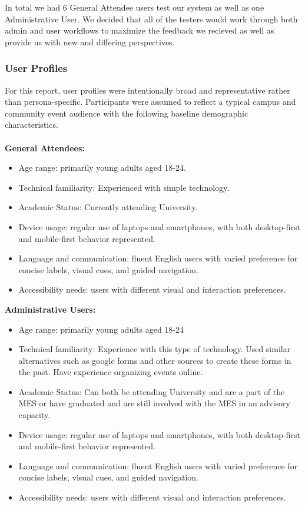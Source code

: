 \documentclass[12pt]{article}
\begin{document}
In total we had 6 General Attendee users test our system as well as one Administrative User. We decided that all of the testers would work through both admin and user workflows to maximize the feedback we recieved as well as provide us with new and differing perspectives.
\subsubsection{User Profiles}
For this report, user profiles were intentionally broad and representative rather than persona-specific. Participants were assumed to reflect a typical campus and community event audience with the following baseline demographic characteristics. \\
\\
\textbf{General Attendees:}

\begin{itemize}
    \item Age range: primarily young adults aged 18-24.
    \item Technical familiarity: Experienced with simple technology.
    \item Academic Status: Currently attending University.
    \item Device usage: regular use of laptops and smartphones, with both desktop-first and mobile-first behavior represented.
    \item Language and communication: fluent English users with varied preference for concise labels, visual cues, and guided navigation.
    \item Accessibility needs: users with different visual and interaction preferences.
\end{itemize}
\textbf{Administrative Users:}
\begin{itemize}
    \item Age range: primarily young adults aged 18-24
    \item Technical familiarity: Experience with this type of technology. Used similar alternatives such as google forms and other sources to create these forms in the past. Have experience organizing events online.
    \item Academic Status: Can both be attending University and are a part of the MES or have graduated and are still involved with the MES in an advisory capacity.
    \item Device usage: regular use of laptops and smartphones, with both desktop-first and mobile-first behavior represented.
    \item Language and communication: fluent English users with varied preference for concise labels, visual cues, and guided navigation.
    \item Accessibility needs: users with different visual and interaction preferences.
\end{itemize}
\end{document}

